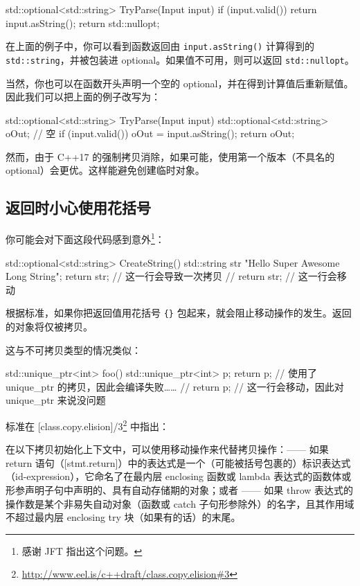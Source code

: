 \begin{codebox}[cpp]
std::optional<std::string> TryParse(Input input)
{
if (input.valid())
return input.asString();
return std::nullopt;
}
\end{codebox}

在上面的例子中，你可以看到函数返回由 \texttt{input.asString()} 计算得到的 \texttt{std::string}，并被包装进 optional。如果值不可用，则可以返回 \texttt{std::nullopt}。

当然，你也可以在函数开头声明一个空的 optional，并在得到计算值后重新赋值。因此我们可以把上面的例子改写为：

\begin{codebox}[cpp]
std::optional<std::string> TryParse(Input input)
{
std::optional<std::string> oOut; // 空
if (input.valid())
oOut = input.asString();
return oOut;
}
\end{codebox}

然而，由于 C++17 的强制拷贝消除，如果可能，使用第一个版本（不具名的 optional）会更优。这样能避免创建临时对象。

\subsection{返回时小心使用花括号}
你可能会对下面这段代码感到意外\footnote{感谢 JFT 指出这个问题。}：

\begin{codebox}[cpp]
std::optional<std::string> CreateString()
{
std::string str {"Hello Super Awesome Long String"};
return {str}; // 这一行会导致一次拷贝
//
return str;
// 这一行会移动
}
\end{codebox}

根据标准，如果你把返回值用花括号 \texttt{\{\}} 包起来，就会阻止移动操作的发生。返回的对象将仅被拷贝。

这与不可拷贝类型的情况类似：

\begin{codebox}[cpp]
std::unique_ptr<int> foo()
{
std::unique_ptr<int> p;
return {p};
// 使用了 unique_ptr 的拷贝，因此会编译失败……
//
return p; // 这一行会移动，因此对 unique_ptr 来说没问题
}
\end{codebox}

标准在 [class.copy.elision]/3\footnote{\url{http://www.eel.is/c++draft/class.copy.elision\#3}} 中指出：

\begin{myQuote}
在以下拷贝初始化上下文中，可以使用移动操作来代替拷贝操作：—— 如果 return 语句（[stmt.return]）中的表达式是一个（可能被括号包裹的）标识表达式（id-expression），它命名了在最内层 enclosing 函数或 lambda 表达式的函数体或形参声明子句中声明的、具有自动存储期的对象；或者 —— 如果 throw 表达式的操作数是某个非易失自动对象（函数或 catch 子句形参除外）的名字，且其作用域不超过最内层 enclosing try 块（如果有的话）的末尾。
\end{myQuote}

